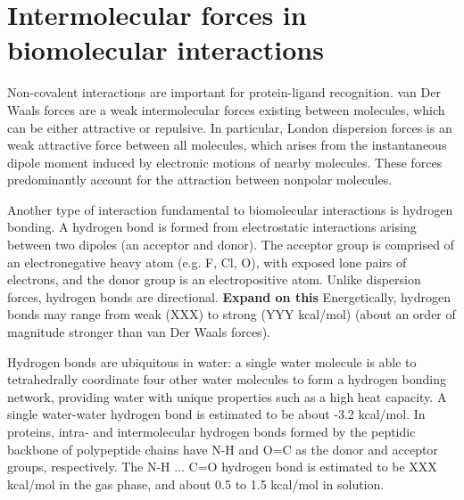 
\section{Intermolecular forces in biomolecular interactions}



Non-covalent interactions are important for protein-ligand recognition.  van Der Waals forces are a weak intermolecular forces existing between molecules, which can be either attractive or repulsive. In particular, London dispersion forces is an weak attractive force between all molecules, which arises from the instantaneous dipole moment induced by electronic motions of nearby molecules. These forces predominantly account for the attraction between nonpolar molecules. 

Another type of interaction fundamental to biomolecular interactions is hydrogen bonding. 
A hydrogen bond is formed from electrostatic interactions arising between two dipoles (an acceptor and donor). The acceptor group is comprised of an electronegative heavy atom (e.g. F, Cl, O), with exposed lone pairs of electrons, and the donor group is an electropositive atom. Unlike dispersion forces, hydrogen bonds are directional. \textbf{Expand on this} Energetically, hydrogen bonds may range from weak (XXX) to strong (YYY kcal/mol) (about an order of magnitude stronger than van Der Waals forces).  %

Hydrogen bonds are ubiquitous in water: a single water molecule is able to tetrahedrally coordinate four other water molecules to form a hydrogen bonding network, providing water with unique properties such as a high heat capacity. A single water-water hydrogen bond is estimated to be about -3.2 kcal/mol.\cite{where did I see this} In proteins, intra- and intermolecular hydrogen bonds formed by the peptidic backbone of polypeptide chains have N-H and O=C as the donor and acceptor groups, respectively. The N-H ... C=O hydrogen bond is estimated to be XXX kcal/mol in the gas phase, and about 0.5 to 1.5 kcal/mol in solution.\cite{energetics of hydrogen bonds in peptides} 

